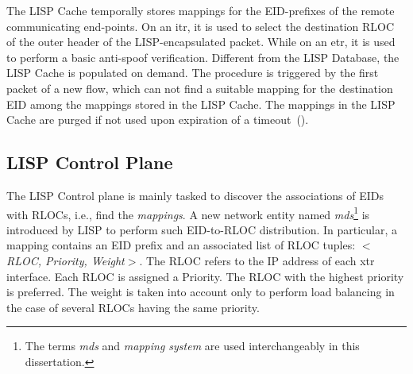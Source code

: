 The LISP Cache temporally stores mappings for the EID-prefixes of the remote communicating end-points. On an \acrshort{itr}, it is used to select the destination RLOC of the outer header of the LISP-encapsulated packet. While on an \acrshort{etr}, it is used to perform a basic anti-spoof verification. Different from the LISP Database, the LISP Cache is populated on demand. The procedure is triggered by the first packet of a new flow, which can not find a suitable mapping for the destination EID among the mappings stored in the LISP Cache. The mappings in the LISP Cache are purged if not used upon expiration of a timeout~(\cite{lispCacheCost,lispCacheDive,lispCacheLRU,lispCacheModel}).

\subsection{LISP Control Plane}
\label{sec:control_plane}

The LISP Control plane is mainly tasked to discover the associations of EIDs with RLOCs, i.e., find the \emph{mappings}. A new network entity named \emph{\acrfull{mds}}\footnote{The terms \emph{\acrfull{mds}} and \emph{mapping system} are used interchangeably in this dissertation.} is introduced by LISP to perform such EID-to-RLOC distribution. In particular, a mapping contains an EID prefix and an associated list of RLOC tuples: \emph{$<$RLOC, Priority, Weight$>$}. The RLOC refers to the IP address of each \acrshort{xtr} interface. Each RLOC is assigned a Priority. The RLOC with the highest priority is preferred. %
The weight is taken into account only to perform load balancing in the case of several RLOCs having the same priority. %

